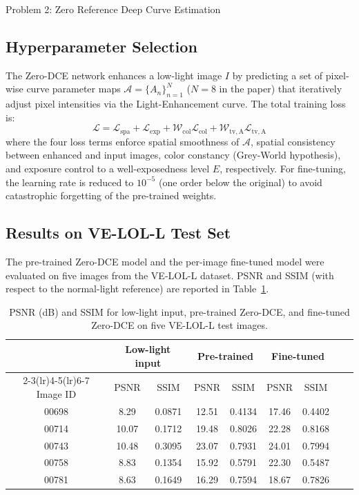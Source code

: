 \documentclass[12pt,a4paper,onecolumn]{exam}
\newcommand{\questionheader}[1]{%
  \begin{tcolorbox}[
    enhanced,
    colback=black,
    coltext=white,
    boxrule=0pt,
    fontupper=\Large\bfseries,
    arc=4mm
  ]
  #1
  \end{tcolorbox}%
}
\begin{document}
\questionheader{Problem 2: Zero Reference Deep Curve Estimation}

\begin{solution}

\subsection*{Hyperparameter Selection}

The Zero-DCE network enhances a low-light image $I$ by predicting a set of pixel-wise curve parameter maps $\mathcal{A} = \{A_n\}_{n=1}^{N}$ ($N=8$ in the paper) that iteratively adjust pixel intensities via the Light-Enhancement curve. The total training loss is:
\[
  \mathcal{L} = \mathcal{L}_{\mathrm{spa}} + \mathcal{L}_{\mathrm{exp}} + \mathcal{W}_{\mathrm{col}}\mathcal{L}_{\mathrm{col}} +\mathcal{W}_{\mathrm{tv,A}}\mathcal{L}_{\mathrm{tv,A}}
\]
where the four loss terms enforce spatial smoothness of $\mathcal{A}$, spatial consistency between enhanced and input images, color constancy (Grey-World hypothesis), and exposure control to a well-exposedness level $E$, respectively. For fine-tuning, the learning rate is reduced to $10^{-5}$ (one order below the original) to avoid catastrophic forgetting of the pre-trained weights. 

\subsection*{Results on VE-LOL-L Test Set}

The pre-trained Zero-DCE model and the per-image fine-tuned model were evaluated on five images from the VE-LOL-L dataset. PSNR and SSIM (with respect to the normal-light reference) are reported in Table~\ref{tab:p2_results}.

\begin{table}[H]
\centering
\caption{PSNR (dB) and SSIM for low-light input, pre-trained Zero-DCE, and fine-tuned Zero-DCE on five VE-LOL-L test images.}
\label{tab:p2_results}
\begin{tabular}{c ccc ccc cc}
\toprule
 & \multicolumn{2}{c}{Low-light input} & \multicolumn{2}{c}{Pre-trained} & \multicolumn{2}{c}{Fine-tuned} \\
\cmidrule(lr){2-3}\cmidrule(lr){4-5}\cmidrule(lr){6-7}
Image ID & PSNR & SSIM & PSNR & SSIM & PSNR & SSIM \\
\midrule
00698 & 8.29  & 0.0871 & 12.51 & 0.4134 & 17.46 & 0.4402 \\
00714 & 10.07 & 0.1712 & 19.48 & 0.8026 & 22.28 & 0.8168 \\
00743 & 10.48 & 0.3095 & 23.07 & 0.7931 & 24.01 & 0.7994 \\
00758 & 8.83  & 0.1354 & 15.92 & 0.5791 & 22.30 & 0.5487 \\
00781 & 8.63  & 0.1649 & 16.29 & 0.7594 & 18.67 & 0.7826 \\
\bottomrule
\end{tabular}
\end{table}


\end{solution}
\end{document}
